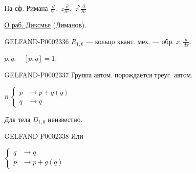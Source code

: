 На сф. Римана $\frac{\partial}{\partial z},\;z\frac{\partial}{\partial z},\;z^2\frac{\partial}{\partial z}$



\underline{О раб. Диксмье} (Лиманов).



\begin{GelfandAdjacentEvidence}{GELFAND-P000233}{6}
$R_{1,0}$ — кольцо квант. мех. — обр. $x,\frac{d}{dx}$.







\end{GelfandAdjacentEvidence}

$p,q,\quad [p,q]=1$.



\begin{GelfandAdjacentEvidence}{GELFAND-P000233}{7}
Группа автом. порождается треуг. автом.



\end{GelfandAdjacentEvidence}

и
$\left\{\begin{aligned}p&\to p+g(q)\\q&\to q\end{aligned}\right.$



Для тела $D_{1,0}$ неизвестно.



\begin{GelfandAdjacentEvidence}{GELFAND-P000233}{8}
Или 
\end{GelfandAdjacentEvidence}


$\left\{\begin{aligned}q&\to q\\p&\to p+g(q)\end{aligned}\right.$



